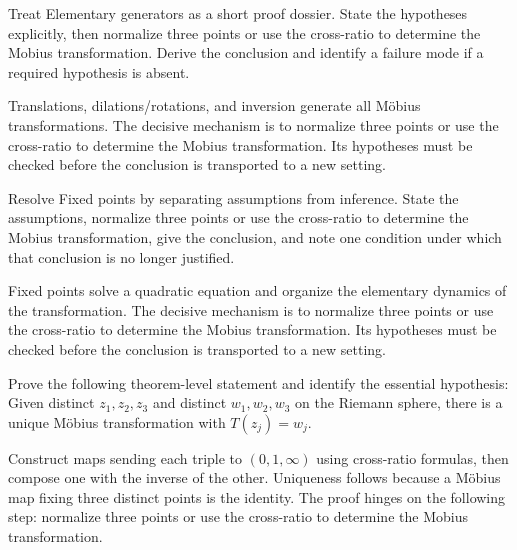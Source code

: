 \begin{problem}\label{prob:iv16-problem-07}
Treat Elementary generators as a short proof dossier. State the hypotheses explicitly, then normalize three points or use the cross-ratio to determine the Mobius transformation. Derive the conclusion and identify a failure mode if a required hypothesis is absent.
\end{problem}
\begin{solution}
Translations, dilations/rotations, and inversion generate all Möbius transformations. The decisive mechanism is to normalize three points or use the cross-ratio to determine the Mobius transformation. Its hypotheses must be checked before the conclusion is transported to a new setting.
\end{solution}

\begin{problem}\label{prob:iv16-problem-08}
Resolve Fixed points by separating assumptions from inference. State the assumptions, normalize three points or use the cross-ratio to determine the Mobius transformation, give the conclusion, and note one condition under which that conclusion is no longer justified.
\end{problem}
\begin{solution}
Fixed points solve a quadratic equation and organize the elementary dynamics of the transformation. The decisive mechanism is to normalize three points or use the cross-ratio to determine the Mobius transformation. Its hypotheses must be checked before the conclusion is transported to a new setting.
\end{solution}

\begin{problem}\label{prob:iv16-problem-09}
Prove the following theorem-level statement and identify the essential hypothesis: Given distinct $z_1,z_2,z_3$ and distinct $w_1,w_2,w_3$ on the Riemann sphere, there is a unique Möbius transformation with $T(z_j)=w_j$.
\end{problem}
\begin{solution}
Construct maps sending each triple to $(0,1,\infty)$ using cross-ratio formulas, then compose one with the inverse of the other. Uniqueness follows because a Möbius map fixing three distinct points is the identity. The proof hinges on the following step: normalize three points or use the cross-ratio to determine the Mobius transformation.
\end{solution}

